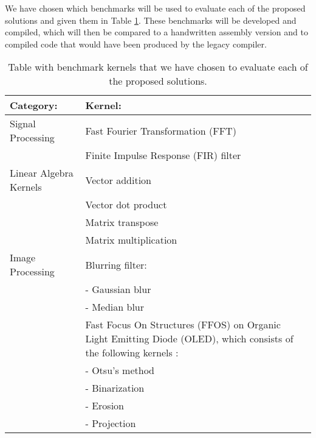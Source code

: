 We have chosen which benchmarks will be used to evaluate each of the proposed solutions and given them in Table \ref{table:benchmarks}. These benchmarks will be developed and compiled, which will then be compared to a handwritten assembly version and to compiled code that would have been produced by the legacy compiler. 

\begin{table}[h]
\caption{Table with benchmark kernels that we have chosen to evaluate each of the proposed solutions.}
\begin{center}
\begin{tabular}{@{}p{}p{}@{}}
\toprule
\textbf{Category:} & \textbf{Kernel:} \\ \hline
{Signal Processing} & Fast Fourier Transformation (FFT) \\
								& Finite Impulse Response (FIR) filter \\
{Linear Algebra Kernels} 	& Vector addition \\
            					& Vector dot product \\
            					& Matrix transpose \\
            					& Matrix multiplication \\
{Image Processing} 	& Blurring filter: \\
					& - Gaussian blur \\
					& - Median blur \\
					& Fast Focus On Structures (FFOS) on Organic Light Emitting Diode (OLED), which consists of the following kernels \cite{ffos}: \\
					& - Otsu's method \\
					& - Binarization \\
					& - Erosion \\
					& - Projection \\
\bottomrule
\end{tabular}
\end{center}
\label{table:benchmarks}
\end{table}%



